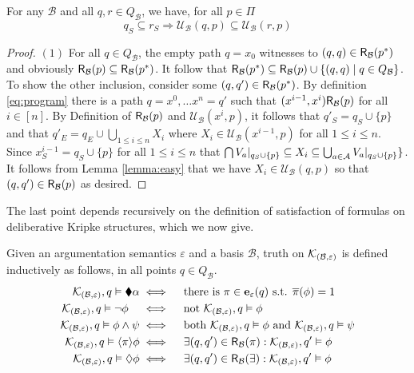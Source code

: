 \documentclass{llncs}
\newcommand{\dlangm}{{\mathcal L}_{\acro{DDL}}^{-}}
\newcommand{\pis}[1]{{\mathbf e}_{#1}}
\newcommand{\carriers}[1]{Q_{#1}}
\newcommand{\kmod}[2]{{\cal K}_{(#1,#2)}}
\newcommand{\rels}[1]{{\sf R_{#1}}}
\newcommand{\update}[3]{{\mathcal U}_{#1}(#2,#3)}
\newcommand{\views}{\mathcal B}
\newcommand{\sem}{\varepsilon}
\begin{document}
\begin{lemma}\label{lemma:easy}
For any $\views$ and all $q,r \in \carriers \views$, we have, for all $p \in \Pi$ $$
q_S \subseteq r_S \Rightarrow \update \views q p \subseteq \update \views r p$$
\end{lemma}

\begin{proof}
$(1)$ For all $q \in \carriers \views$, the empty path $q = x_0$ witnesses to $(q,q) \in \rels \views(p^\ast)$ and obviously $\rels \views(p) \subseteq \rels \views(p^\ast)$. It follow that $\rels \views(p^\ast) \subseteq \rels \views(p) \cup \{(q,q) \mid q \in \carriers \views\}$. To show the other inclusion, consider some $(q,q') \in \rels \views(p^\ast)$. By definition \ref{eq:program} there is a path $q = x^0,\ldots x^n = q'$ such that $(x^{i-1},x^i) \rels \views(p)$ for all $i \in [n]$. By Definition of $\rels \views(p)$ and $\update \views {x^i} p$, it follows that $q'_S = q_S \cup \{p\}$ and that $q'_E = q_E \cup \bigcup_{1 \leq i \leq n}X_i$ where $X_i \in \update \views {x^{i-1}} p$ for all $1 \leq i \leq n$. Since $x^{i-1}_S = q_S \cup \{p\}$ for all $1 \leq i \leq n$ that $\bigcap {V_a}|_{q_S \cup \{p\}} \subseteq X_i \subseteq \bigcup_{a \in \mathcal A}{V_a}|_{q_S \cup \{p\}}\}$. It follows from Lemma \ref{lemma:easy} that we have $X_i \in \update \views q p$ so that $(q,q') \in \rels \views(p)$ as desired.
\end{proof}

The last point depends recursively on the definition of satisfaction of formulas on deliberative Kripke structures, which we now give.

\begin{definition}[$\dlangm$-satisfaction]\label{def:ddlm}
Given an argumentation semantics $\sem$ and a basis $\views$, truth on $\kmod \views \sem$ is defined inductively as follows, in all points $q \in \carriers \views$.
\begin{align*}
\kmod \views \sem, q \vDash \cdia \alpha & \iff \quad \text{there is } \pi \in \pis \sem(q) \text{ s.t. } \overline\pi(\phi) = 1 \\
\kmod \views \sem, q \vDash \neg \phi \quad & \iff \quad \text{not } \kmod \views \sem, q \vDash \phi \\
\kmod \views \sem, q \vDash \phi \wedge \psi & \iff \quad  \text{both } \kmod \views \sem, q \vDash \phi \text{ and } \kmod \views \sem, q \vDash \psi \\
\kmod \views \sem, q \vDash \ddia \pi \phi & \iff \quad \exists (q,q') \in \rels \views(\pi): \kmod \views \sem,q' \vDash \phi \\
\kmod \views \sem, q \vDash \adia \phi & \iff \quad \exists (q,q') \in \rels \views(\exists): \kmod \views \sem,q' \vDash \phi \\
\end{align*}
\end{definition}
\end{document}
